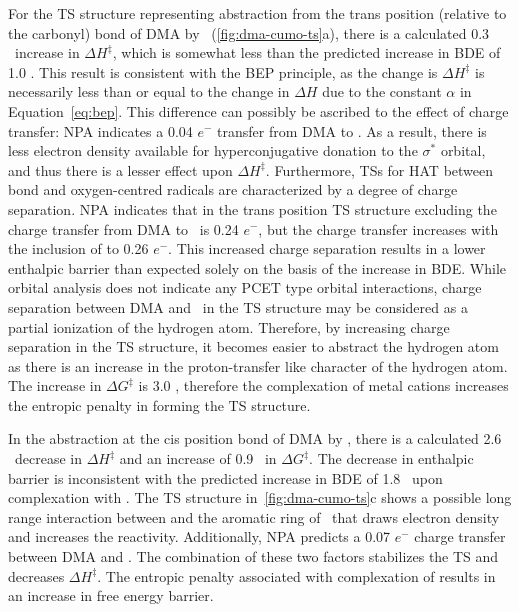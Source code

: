 \begin{doublespace}
For the TS structure representing abstraction from the trans position (relative
to the carbonyl)  bond of DMA by \cumo\ (\ref{fig:dma-cumo-ts}a), there
is a calculated 0.3 \kcalmol\ increase in $\Delta H^\ddagger$, which is somewhat
less than the predicted increase in BDE of 1.0 \kcalmol. This result is
consistent with the BEP principle, as the change is $\Delta H^\ddagger$ is
necessarily less than or equal to the change in $\Delta H$ due to the constant
$\alpha$ in Equation~\ref{eq:bep}. This difference can possibly be ascribed to
the effect of charge transfer: NPA indicates a 0.04 $e^-$ transfer from DMA to
. As a result, there is less electron density available for
hyperconjugative donation to the  $\sigma^*$ orbital, and thus there is
a lesser effect upon $\Delta H^\ddagger$.  Furthermore, TSs for HAT between
 bond and oxygen-centred radicals are characterized by a degree of
charge separation.\cite{Roberts1999} NPA indicates that in the trans position TS
structure excluding  the charge transfer from DMA to \cumo\ is 0.24
$e^-$, but the charge transfer increases with the inclusion of  to 0.26
$e^-$. This increased charge separation results in a lower enthalpic barrier
than expected solely on the basis of the increase in  BDE. While orbital
analysis does not indicate any PCET type orbital interactions, charge separation
between DMA and \cumo\ in the TS structure may be considered as a partial
ionization of the hydrogen atom. Therefore, by increasing charge separation in
the TS structure, it becomes easier to abstract the hydrogen atom as there is an
increase in the proton-transfer like character of the hydrogen atom. The
increase in $\Delta G^\ddagger$ is 3.0 \kcalmol, therefore the complexation of
metal cations increases the entropic penalty in forming the TS structure.

In the abstraction at the cis position  bond of DMA by \cumo, there is a
calculated 2.6 \kcalmol\ decrease in $\Delta H^\ddagger$ and an increase of 0.9
\kcalmol\ in $\Delta G^\ddagger$. The decrease in enthalpic barrier is
inconsistent with the predicted increase in BDE of 1.8 \kcalmol\ upon
complexation with . The TS structure in~\ref{fig:dma-cumo-ts}c shows a
possible long range interaction between  and the aromatic ring of \cumo\
that draws electron density and increases the reactivity. Additionally, NPA
predicts a 0.07 $e^-$ charge transfer between DMA and \ch{Na}. The combination
of these two factors stabilizes the TS and decreases $\Delta H^\ddagger$. The
entropic penalty associated with complexation of \ch{NaCl} results in an
increase in free energy barrier.


\end{doublespace}
